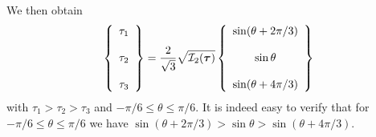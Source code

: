 We then obtain 
\begin{equation}
\left\{
\begin{array}{c}
\tau_1 \\ \\
\tau_2 \\ \\
\tau_3
\end{array}
\right\}
= \frac{2  }{\sqrt{3}}\sqrt{ {\cal I}_2({\bm \tau})  }
\left\{
\begin{array}{c}
\sin (\theta + 2\pi/3)  \\ \\
\sin \theta   \\ \\
\sin (\theta + 4\pi/3  )
\end{array}
\right\}
\end{equation}
with $\tau_1>\tau_2>\tau_3$ and $-\pi/6 \leq \theta \leq \pi/6$. It is indeed easy to verify that 
for $-\pi/6 \leq \theta \leq \pi/6$ we have  
$\sin (\theta + 2\pi/3) > \sin \theta > \sin (\theta + 4\pi/3)$.

